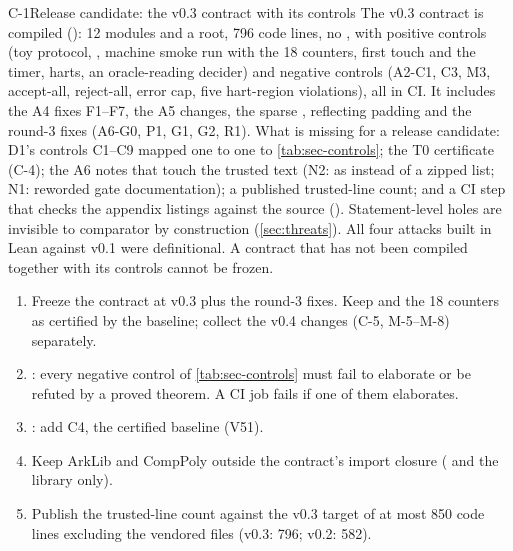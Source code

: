 \begin{issue}{C-1}{Release candidate: the v0.3 contract with its controls}
\IRprob The v0.3 contract is compiled (): 12 modules and a root, 796 code lines,
no , with positive controls (toy protocol, , machine smoke run with the
18 counters, first touch and the timer, harts, an oracle-reading decider) and negative controls (A2-C1,
C3, M3, accept-all, reject-all, error cap, five hart-region violations), all in CI. It includes the
A4 fixes F1--F7, the A5 changes, the sparse , reflecting padding and the round-3 fixes
(A6-G0, P1, G1, G2, R1). What is missing for a release candidate: D1's controls C1--C9 mapped one to
one to \cref{tab:sec-controls}; the T0 certificate (C-4); the A6 notes that touch the trusted text
(N2:  as  instead of a zipped list; N1: reworded gate
documentation); a published trusted-line count; and a CI step that checks the appendix listings
against the source ().
\IRwhy Statement-level holes are invisible to comparator by construction
(\cref{sec:threats}). All four attacks built in Lean against v0.1 were definitional. A contract that
has not been compiled together with its controls cannot be frozen.
\IRres
\begin{enumerate}[nosep,leftmargin=1.4em]
\item Freeze the contract at v0.3 plus the round-3 fixes. Keep  and the 18
  counters as certified by the baseline; collect the v0.4 changes (C-5, M-5--M-8) separately.
\item {}: every negative control of \cref{tab:sec-controls} must fail to
  elaborate or be refuted by a proved theorem. A CI job fails if one of them elaborates.
\item {}: add C4, the certified baseline (V51).
\item Keep ArkLib and CompPoly outside the contract's import closure ( and the library
  only).
\item Publish the trusted-line count against the v0.3 target of at most 850 code lines excluding the
  vendored  files (v0.3: 796; v0.2: 582).
\end{enumerate}
\end{issue}

